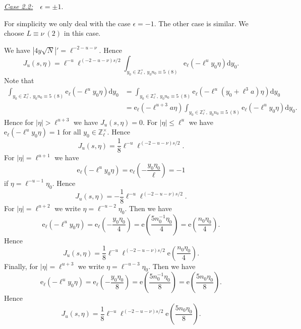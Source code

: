 \documentclass[10pt,oneside,reqno]{amsart}
\makeatletter
\newcommand\rmd{\mathrm{d}}
\newcommand\rme{\mathrm{e}}
\newcommand\ZZ{\mathbb{Z}}
\renewcommand\leq{\leqslant}
\theoremstyle{THEOREM}
\theoremstyle{DEFINITION}
\theoremstyle{EXERCISE}
\numberwithin{equation}{section}
\renewenvironment{proof}[1][\proofname]{\par
  \vspace{-6pt}
  \pushQED{\qed}
  \normalfont \topsep6\p@\@plus6\p@\relax
  \trivlist
  \item[\hskip\labelsep\rmfamily\bfseries
    #1\@addpunct{:}]\ignorespaces
}{
  \popQED\endtrivlist\@endpefalse
  \vspace{-6pt}
}
\makeatother
\begin{document}
\begin{proof}
\underline{\emph{Case 2.2:}}\ \ $\epsilon=\pm 1$.

For simplicity we only deal with the case  $\epsilon=-1$. The other case is similar.
We choose $L\equiv \nu \ (2)$ in this case.

We have $|4y\sqrt{N}|'=\ell^{-2-u-\nu}$. Hence
\[
J_u(s,\eta)=\ell^{-u}\ell^{(-2-u-\nu)s/2}\int_{y_0\in\ZZ_\ell^\times,\ y_0n_0\equiv 5\ (8)} \rme_\ell(-\ell^uy_0\eta)\rmd y_0.
\]
Note that
\begin{align*}
   \int_{y_0\in\ZZ_\ell^\times,\ y_0n_0\equiv 5\ (8)} \rme_\ell(-\ell^uy_0\eta)\rmd y_0 & =\int_{y_0\in\ZZ_\ell^\times,\ y_0n_0\equiv 5\ (8)} \rme_\ell(-\ell^u(y_0+\ell^3 a)\eta)\rmd y_0  \\
     & =\rme_\ell(-\ell^{u+3}a\eta)\int_{y_0\in\ZZ_\ell^\times,\ y_0n_0\equiv 5\ (8)} \rme_\ell(-\ell^uy_0\eta)\rmd y_0.
\end{align*}
Hence for $|\eta|>\ell^{u+3}$ we have $J_u(s,\eta)=0$. For $|\eta| \leq \ell^u$ we have $\rme_\ell(-\ell^uy_0\eta)=1$ for all $y_0\in \ZZ_\ell^\times$. Hence
\[
J_u(s,\eta)=\frac{1}{8}\ell^{-u}\ell^{(-2-u-\nu)s/2}.
\]
For $|\eta|= \ell^{u+1}$ we have 
\[
\rme_\ell(-\ell^u y_0\eta)=\rme_\ell\left(-\frac{y_0\eta_0}{\ell}\right)=-1
\]
if $\eta=\ell^{-u-1}\eta_0$. Hence 
\[
J_u(s,\eta)=-\frac{1}{8}\ell^{-u}\ell^{(-2-u-\nu)s/2}.
\]
For $|\eta|= \ell^{u+2}$ we write $\eta=\ell^{-u-2}\eta_0$. Then we have
\[
\rme_\ell(-\ell^u y_0\eta)=\rme_\ell\left(-\frac{y_0\eta_0}{4}\right)=\rme\left(\frac{5n_0^{-1}\eta_0}{4}\right)= \rme\left(\frac{n_0\eta_0}{4}\right).
\]
Hence
\[
J_u(s,\eta)=\frac{1}{8}\ell^{-u}\ell^{(-2-u-\nu)s/2}\rme\left(\frac{n_0\eta_0}{4}\right).
\]
Finally, for $|\eta|= \ell^{u+3}$ we write $\eta=\ell^{-u-3}\eta_0$. Then we have
\[
\rme_\ell(-\ell^u y_0\eta)=\rme_\ell\left(-\frac{y_0\eta_0}{8}\right)=\rme\left(\frac{5n_0^{-1}\eta_0}{8}\right)= \rme\left(\frac{5n_0\eta_0}{8}\right).
\]
Hence
\[
J_u(s,\eta)=\frac{1}{8}\ell^{-u}\ell^{(-2-u-\nu)s/2}\rme\left(\frac{5n_0\eta_0}{8}\right).
\]


\end{proof}
\end{document}
